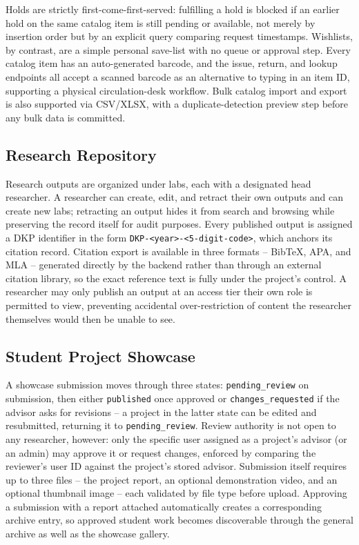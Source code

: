 \documentclass[12pt]{article}
\begin{document}
Holds are strictly first-come-first-served: fulfilling a hold is blocked if an earlier hold on the same catalog item is still pending or available, not merely by insertion order but by an explicit query comparing request timestamps. Wishlists, by contrast, are a simple personal save-list with no queue or approval step. Every catalog item has an auto-generated barcode, and the issue, return, and lookup endpoints all accept a scanned barcode as an alternative to typing in an item ID, supporting a physical circulation-desk workflow. Bulk catalog import and export is also supported via CSV/XLSX, with a duplicate-detection preview step before any bulk data is committed.

\subsection{Research Repository}
Research outputs are organized under labs, each with a designated head researcher. A researcher can create, edit, and retract their own outputs and can create new labs; retracting an output hides it from search and browsing while preserving the record itself for audit purposes. Every published output is assigned a DKP identifier in the form \texttt{DKP-<year>-<5-digit-code>}, which anchors its citation record. Citation export is available in three formats -- BibTeX, APA, and MLA -- generated directly by the backend rather than through an external citation library, so the exact reference text is fully under the project's control. A researcher may only publish an output at an access tier their own role is permitted to view, preventing accidental over-restriction of content the researcher themselves would then be unable to see.

\subsection{Student Project Showcase}
A showcase submission moves through three states: \texttt{pending\_review} on submission, then either \texttt{published} once approved or \texttt{changes\_requested} if the advisor asks for revisions -- a project in the latter state can be edited and resubmitted, returning it to \texttt{pending\_review}. Review authority is not open to any researcher, however: only the specific user assigned as a project's advisor (or an admin) may approve it or request changes, enforced by comparing the reviewer's user ID against the project's stored advisor. Submission itself requires up to three files -- the project report, an optional demonstration video, and an optional thumbnail image -- each validated by file type before upload. Approving a submission with a report attached automatically creates a corresponding archive entry, so approved student work becomes discoverable through the general archive as well as the showcase gallery.
\end{document}
